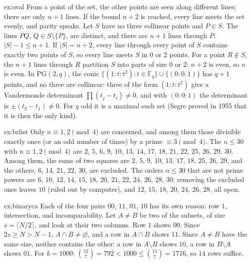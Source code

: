 \begin{solution}{ex:oval}
\idea From a point of the set, the other points are seen along different lines; there are only $n+1$ lines. If the bound $n+2$ is reached, every line meets the set evenly, and parity speaks.
\writeup Let $S$ have no three collinear points and $P\in S$. The lines $PQ$, $Q\in S\setminus\{P\}$, are distinct, and there are $n+1$ lines through $P$: $|S|-1\le n+1$. If $|S|=n+2$, every line through every point of $S$
contains exactly two points of $S$, so every line meets $S$ in $0$ or $2$ points. For a point $R\notin S$, the $n+1$ lines through $R$ partition $S$ into parts of size $0$ or $2$: $n+2$ is even, so $n$ is even. In
$\mathrm{PG}(2,q)$, the conic $\{(1:t:t^2):t\in\mathbb F_q\}\cup\{(0:0:1)\}$ has $q+1$ points, and no three are collinear: three of the form $(1:t:t^2)$ give a Vandermonde determinant $\prod(t_j-t_i)\ne0$, and with
$(0:0:1)$ the determinant is $\pm(t_2-t_1)\ne0$. For $q$ odd it is a maximal such set (Segre proved in 1955 that it is then the only kind).
\end{solution}

\begin{solution}{ex:brlist}
\idea Only $n\equiv1,2\pmod4$ are concerned, and among them those divisible exactly once (or an odd number of times) by a prime $\equiv3\pmod4$.
\writeup The $n\le30$ with $n\equiv1,2\pmod 4$ are $2$, $5$, $6$, $9$, $10$, $13$, $14$, $17$, $18$, $21$, $22$, $25$, $26$, $29$, $30$. Among them, the sums of two squares are $2$, $5$, $9$, $10$, $13$, $17$, $18$, $25$, $26$, $29$, and the others, $6$, $14$, $21$, $22$, $30$, are excluded. The
orders $n\le30$ that are not prime powers are $6$, $10$, $12$, $14$, $15$, $18$, $20$, $21$, $22$, $24$, $26$, $28$, $30$; removing the excluded ones leaves $10$ (ruled out by computer), and $12$, $15$, $18$, $20$, $24$, $26$, $28$, all open.
\end{solution}

\begin{solution}{ex:binaryca}
\idea Each of the four pairs $00$, $11$, $01$, $10$ has its own reason: row $1$, intersection, and incomparability.
\writeup Let $A\ne B$ be two of the subsets, of size $s=\lceil N/2\rceil$, and look at their two columns. Row $1$ shows $00$. Since $2s\ge N>N-1$, $A\cap B\ne\varnothing$, and a row in $A\cap B$ shows $11$. Since $A\ne B$
have the same size, neither contains the other: a row in $A\setminus B$ shows $10$, a row in $B\setminus A$ shows $01$. For $k=1000$: $\binom{12}7=792<1000\le\binom{13}7=1716$, so $14$ rows suffice.
\end{solution}

